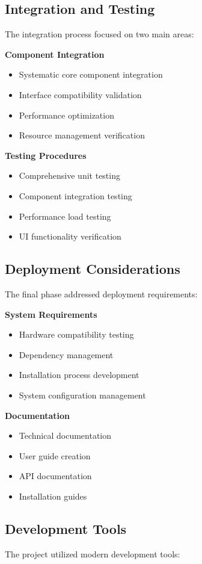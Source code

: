 \subsection{Integration and Testing}
The integration process focused on two main areas:

\textbf{Component Integration}
\begin{itemize}
    \item Systematic core component integration
    \item Interface compatibility validation
    \item Performance optimization
    \item Resource management verification
\end{itemize}

\textbf{Testing Procedures}
\begin{itemize}
    \item Comprehensive unit testing
    \item Component integration testing
    \item Performance load testing
    \item UI functionality verification
\end{itemize}

\subsection{Deployment Considerations}
The final phase addressed deployment requirements:

\textbf{System Requirements}
\begin{itemize}
    \item Hardware compatibility testing
    \item Dependency management
    \item Installation process development
    \item System configuration management
\end{itemize}

\textbf{Documentation}
\begin{itemize}
    \item Technical documentation
    \item User guide creation
    \item API documentation
    \item Installation guides
\end{itemize}

\subsection{Development Tools}
The project utilized modern development tools:

